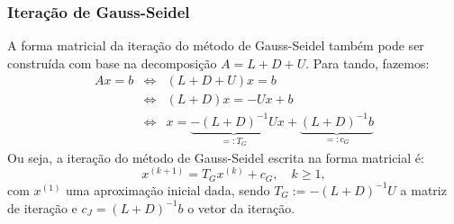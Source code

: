 \subsubsection{Iteração de Gauss-Seidel}

A forma matricial da iteração do método de Gauss-Seidel também pode ser construída com base na decomposição $A = L + D + U$. Para tando, fazemos:
\begin{eqnarray}
  Ax = b &\Leftrightarrow& (L + D + U)x = b\\
  &\Leftrightarrow& (L + D)x = -Ux + b\\
  &\Leftrightarrow& x = \underbrace{-(L + D)^{-1}U}_{=: T_G}x + \underbrace{(L+D)^{-1}b}_{=: c_G}
\end{eqnarray}
Ou seja, a iteração do método de Gauss-Seidel escrita na forma matricial é:
\begin{equation}
  x^{(k+1)} = T_Gx^{(k)} + c_G,\quad k\geq 1,
\end{equation}
com $x^{(1)}$ uma aproximação inicial dada, sendo $T_G := -(L+D)^{-1}U$ a matriz de iteração e $c_J = (L+D)^{-1}b$ o vetor da iteração.


